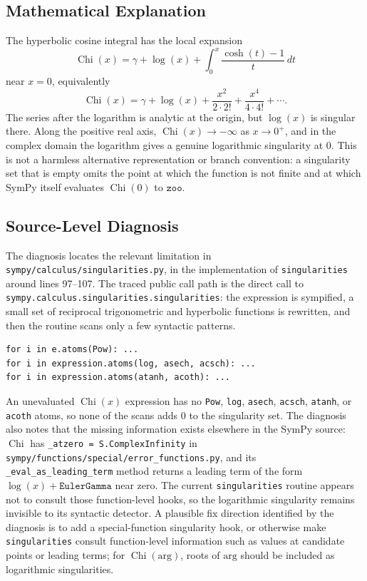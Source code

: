 \documentclass[11pt]{article}
\begin{document}
\subsection{Mathematical Explanation}

The hyperbolic cosine integral has the local expansion
\[
\operatorname{Chi}(x)
  = \gamma + \log(x)
    + \int_0^x \frac{\cosh(t)-1}{t}\,dt
\]
near \(x=0\), equivalently
\[
\operatorname{Chi}(x)
  = \gamma + \log(x)
    + \frac{x^2}{2\cdot 2!}
    + \frac{x^4}{4\cdot 4!}
    + \cdots .
\]
The series after the logarithm is analytic at the origin, but
\(\log(x)\) is singular there. Along the positive real axis,
\(\operatorname{Chi}(x)\to -\infty\) as \(x\to 0^+\), and in the complex
domain the logarithm gives a genuine logarithmic singularity at \(0\). This is
not a harmless alternative representation or branch convention: a singularity
set that is empty omits the point at which the function is not finite and at
which SymPy itself evaluates \(\operatorname{Chi}(0)\) to \(\texttt{zoo}\).

\subsection{Source-Level Diagnosis}

The diagnosis locates the relevant limitation in
\nolinkurl{sympy/calculus/singularities.py}, in the implementation of
\texttt{singularities} around lines 97--107. The traced public call path is the
direct call to \texttt{sympy.calculus.singularities.singularities}: the
expression is sympified, a small set of reciprocal trigonometric and hyperbolic
functions is rewritten, and then the routine scans only a few syntactic
patterns.

\begin{lstlisting}[style=bugpython]
for i in e.atoms(Pow): ...
for i in expression.atoms(log, asech, acsch): ...
for i in expression.atoms(atanh, acoth): ...
\end{lstlisting}

An unevaluated \(\operatorname{Chi}(x)\) expression has no \texttt{Pow},
\texttt{log}, \texttt{asech}, \texttt{acsch}, \texttt{atanh}, or \texttt{acoth}
atoms, so none of the scans adds \(0\) to the singularity set. The diagnosis
also notes that the missing information exists elsewhere in the SymPy source:
\(\operatorname{Chi}\) has \texttt{\_atzero = S.ComplexInfinity} in
\nolinkurl{sympy/functions/special/error_functions.py}, and its
\texttt{\_eval\_as\_leading\_term} method returns a leading term of the form
\(\log(x)+\texttt{EulerGamma}\) near zero. The current \texttt{singularities}
routine appears not to consult those function-level hooks, so the logarithmic
singularity remains invisible to its syntactic detector. A plausible fix
direction identified by the diagnosis is to add a special-function singularity
hook, or otherwise make \texttt{singularities} consult function-level
information such as values at candidate points or leading terms; for
\(\operatorname{Chi}(\mathrm{arg})\), roots of \(\mathrm{arg}\) should be
included as logarithmic singularities.
\end{document}
